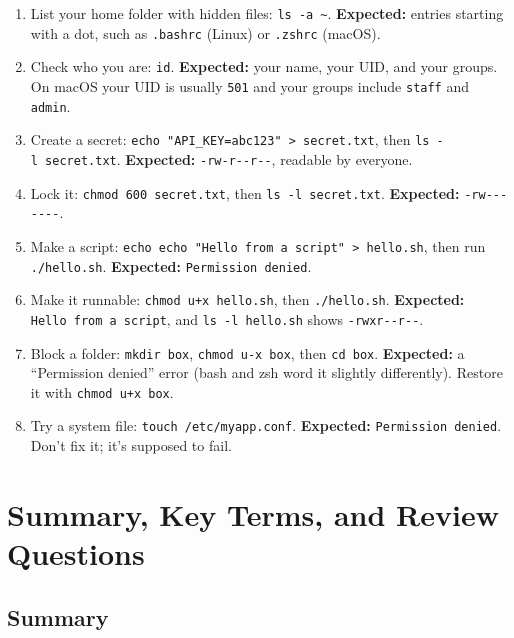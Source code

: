 \begin{enumerate}
\def\labelenumi{\arabic{enumi}.}
\tightlist
\item
  List your home folder with hidden files: \texttt{ls\ -a\ \textasciitilde{}}. \textbf{Expected:} entries starting with a dot, such as \texttt{.bashrc} (Linux) or \texttt{.zshrc} (macOS).
\item
  Check who you are: \texttt{id}. \textbf{Expected:} your name, your UID, and your groups. On macOS your UID is usually \texttt{501} and your groups include \texttt{staff} and \texttt{admin}.
\item
  Create a secret: \texttt{echo\ "API\_}\allowbreak{}\texttt{KEY=}\allowbreak{}\texttt{abc123"\ \textgreater{}\ secret.}\allowbreak{}\texttt{txt}, then \texttt{ls\ -l\ secret.txt}. \textbf{Expected:} \texttt{-rw-r-\/-r-\/-}, readable by everyone.
\item
  Lock it: \texttt{chmod\ 600\ secret.txt}, then \texttt{ls\ -l\ secret.txt}. \textbf{Expected:} \texttt{-rw-\/-\/-\/-\/-\/-\/-}.
\item
  Make a script: \texttt{echo\ \textquotesingle{}echo\ "Hello\ from\ a\ script"\textquotesingle{}\ \textgreater{}\ hello.}\allowbreak{}\texttt{sh}, then run \texttt{./hello.sh}. \textbf{Expected:} \texttt{Permission\ denied}.
\item
  Make it runnable: \texttt{chmod\ u+x\ hello.sh}, then \texttt{./hello.sh}. \textbf{Expected:} \texttt{Hello\ from\ a\ script}, and \texttt{ls\ -l\ hello.sh} shows \texttt{-rwxr-\/-r-\/-}.
\item
  Block a folder: \texttt{mkdir\ box}, \texttt{chmod\ u-x\ box}, then \texttt{cd\ box}. \textbf{Expected:} a ``Permission denied'' error (bash and zsh word it slightly differently). Restore it with \texttt{chmod\ u+x\ box}.
\item
  Try a system file: \texttt{touch\ /}\allowbreak{}\texttt{etc/}\allowbreak{}\texttt{myapp.conf}. \textbf{Expected:} \texttt{Permission\ denied}. Don't fix it; it's supposed to fail.
\end{enumerate}

\section{Summary, Key Terms, and Review Questions}\label{03-files-folders-and-who-may-touch-them:summary-key-terms-and-review-questions}

\subsection*{Summary}\label{03-files-folders-and-who-may-touch-them:summary}

